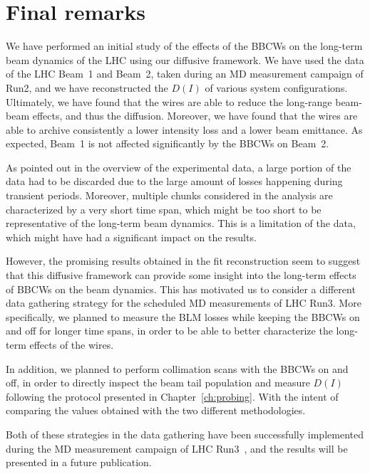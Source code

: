 \section{Final remarks}

We have performed an initial study of the effects of the BBCWs on the long-term beam dynamics of the LHC using our diffusive framework. We have used the data of the LHC Beam~1 and Beam~2, taken during an MD measurement campaign of Run2, and we have reconstructed the $D(I)$ of various system configurations. Ultimately, we have found that the wires are able to reduce the long-range beam-beam effects, and thus the diffusion. Moreover, we have found that the wires are able to archive consistently a lower intensity loss and a lower beam emittance. As expected, Beam~1 is not affected significantly by the BBCWs on Beam~2.

As pointed out in the overview of the experimental data, a large portion of the data had to be discarded due to the large amount of losses happening during transient periods. Moreover, multiple chunks considered in the analysis are characterized by a very short time span, which might be too short to be representative of the long-term beam dynamics. This is a limitation of the data, which might have had a significant impact on the results.

However, the promising results obtained in the fit reconstruction seem to suggest that this diffusive framework can provide some insight into the long-term effects of BBCWs on the beam dynamics. This has motivated us to consider a different data gathering strategy for the scheduled MD measurements of LHC Run3. More specifically, we planned to measure the BLM losses while keeping the BBCWs on and off for longer time spans, in order to be able to better characterize the long-term effects of the wires.

In addition, we planned to perform collimation scans with the BBCWs on and off, in order to directly inspect the beam tail population and measure $D(I)$ following the protocol presented in Chapter~\ref{ch:probing}. With the intent of comparing the values obtained with the two different methodologies.

Both of these strategies in the data gathering have been successfully implemented during the MD measurement campaign of LHC Run3~\cite{}, and the results will be presented in a future publication.